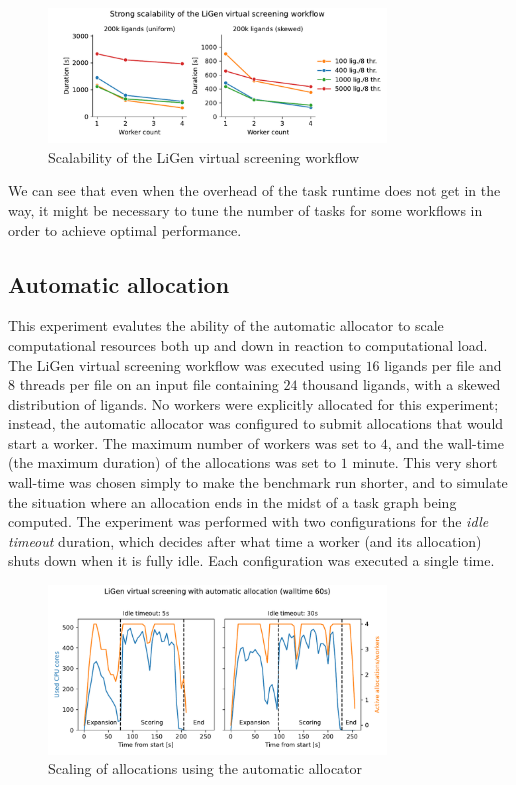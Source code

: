 \begin{figure}[h]
	\centering
	\includegraphics[width=0.8\textwidth]{imgs/hq/charts/ligen-aggregation-scalability}
	\caption{Scalability of the LiGen virtual screening workflow}
	\label{fig:hq-ligen-scalability}
\end{figure}

We can see that even when the overhead of the task runtime does not get in the way, it might be
necessary to tune the number of tasks for some workflows in order to achieve optimal performance.

\subsection{Automatic allocation}
\label{sec:hq-exp-autoalloc}
This experiment evalutes the ability of the automatic allocator to scale computational resources
both up and down in reaction to computational load. The LiGen virtual screening workflow was
executed using $16$ ligands per file and $8$ threads per
file on an input file containing $24$ thousand ligands, with a skewed
distribution of ligands. No workers were explicitly allocated for this experiment; instead, the
automatic allocator was configured to submit allocations that would start a worker. The maximum
number of workers was set to $4$, and the wall-time (the maximum duration) of
the allocations was set to $1$ minute. This very short wall-time was chosen
simply to make the benchmark run shorter, and to simulate the situation where an allocation ends in
the midst of a task graph being computed. The experiment was performed with two configurations for
the \emph{idle timeout} duration, which decides after what time a worker (and its allocation)
shuts down when it is fully idle. Each configuration was executed a single time.

\begin{figure}[h]
	\centering
	\includegraphics[width=0.8\textwidth]{imgs/hq/charts/ligen-autoalloc-stats}
	\caption{Scaling of allocations using the automatic allocator}
	\label{fig:hq-ligen-autoalloc}
\end{figure}

